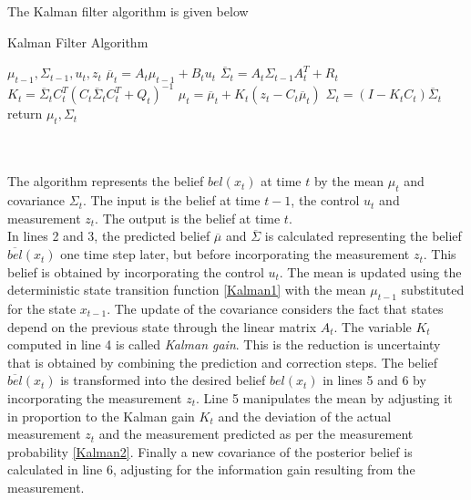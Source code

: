 \documentclass[conference]{IEEEtran}
\begin{document}
The Kalman filter algorithm is given below

\begin{minipage}{\linewidth}
  \begin{algorithm}[H]
    \caption{Kalman Filter Algorithm}\label{AlgKalman}
    \begin{algorithmic}[1]
       {$\mu_{t-1},\Sigma_{t-1}, u_t,z_t$}
	\State $\overline \mu_t = A_t \mu_{t-1} + B_t u_t$
	\State $\overline \Sigma_t= A_t \Sigma_{t-1} A_t^T + R_t$  
	\State $K_t = \overline \Sigma_t C_t^T{(C_t \overline \Sigma_t C_t^T + Q_t)}^{-1}$
	\State $\mu_t = \overline \mu_t + K_t(z_t - C_t \overline \mu_t)$
	\State $\Sigma_t = (I - K_t C_t) \overline \Sigma_t$
	\State return $\mu_t, \Sigma_t$
      \EndProcedure
    \end{algorithmic}
  \end{algorithm}
\end{minipage}\\\\

The algorithm represents the belief $bel(x_t)$ at time $t$ by the mean $\mu_t$ and covariance $\Sigma_t$. The input is the belief at time $t-1$, the control $u_t$ and measurement $z_t$. The output is the belief at time $t$.\\

In lines 2 and 3, the predicted belief $\overline \mu$ and $\overline \Sigma$ is calculated representing the belief $\overline{bel}(x_t)$ one time step later, but before incorporating the measurement $z_t$. This belief is obtained by incorporating the control $u_t$. The mean is updated using the deterministic state transition function \ref{Kalman1} with the mean $\mu_{t-1}$ substituted for the state $x_{t-1}$. The update of the covariance considers the fact that states depend on the previous state through the linear matrix $A_t$. The variable $K_t$ computed in line 4 is called \textit{Kalman gain}. This is the reduction is uncertainty that is obtained by combining the prediction and correction steps. The belief $\overline{bel}(x_t)$ is transformed into the desired belief ${bel}(x_t)$ in lines 5 and 6 by incorporating the measurement $z_t$. Line 5 manipulates the mean by adjusting it in proportion to the Kalman gain $K_t$ and the deviation of the actual measurement $z_t$ and the measurement predicted as per the measurement probability \ref{Kalman2}. Finally a new covariance of the posterior belief is calculated in line 6, adjusting for the information gain resulting from the measurement.\\
\end{document}
